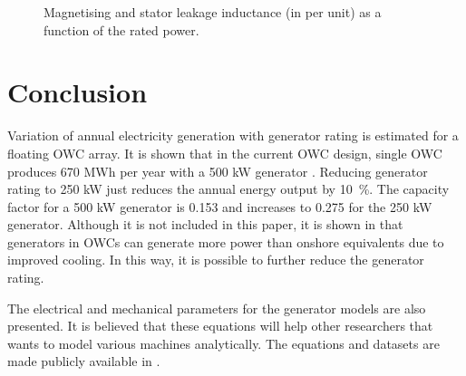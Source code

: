 \documentclass[twocolumn]{article}
\begin{document}
\begin{figure}[t!]
  \centering

    \caption{Magnetising and stator leakage inductance (in per unit) as a function of the rated power.} 
    \label{inductance_plots}
\end{figure}


\section{Conclusion}

Variation of annual electricity generation with generator rating is estimated for a floating OWC array. It is shown that in the current OWC design, single OWC produces 670 MWh per year with a 500 kW generator . Reducing generator rating to 250 kW just reduces the annual energy output by 10~\%. The capacity factor for a 500 kW generator is 0.153 and increases to 0.275 for the 250 kW generator. Although it is not included in this paper, it is shown in \cite{Hodgings2010a} that generators in OWCs can generate more power than onshore equivalents due to improved cooling. In this way, it is possible to further reduce the generator rating.

The electrical and mechanical parameters for the generator models are also presented. It is believed that these equations will help other researchers that wants to model various machines analytically. The equations and datasets are made publicly available in \cite{Keysana}. 
\end{document}
